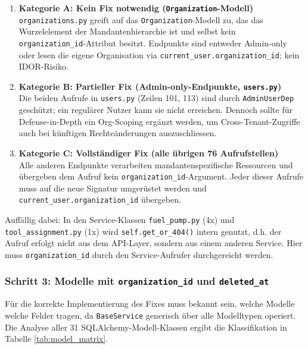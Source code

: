 \begin{enumerate}
    \item \textbf{Kategorie A: Kein Fix notwendig (\texttt{Organization}-Modell)}\\
          \texttt{organizations.py} greift auf das \texttt{Organization}-Modell zu, das
          das Wurzelelement der Mandantenhierarchie ist und selbst kein
          \texttt{organization\_id}-Attribut besitzt. Endpunkte sind entweder
          Admin-only oder lesen die eigene Organisation via
          \texttt{current\_user.organization\_id}; kein IDOR-Risiko.

    \item \textbf{Kategorie B: Partieller Fix (Admin-only-Endpunkte, \texttt{users.py})}\\
          Die beiden Aufrufe in \texttt{users.py} (Zeilen 101, 113) sind durch
          \texttt{AdminUserDep} geschützt; ein regulärer Nutzer kann sie nicht
          erreichen. Dennoch sollte für Defense-in-Depth ein Org-Scoping ergänzt werden,
          um Cross-Tenant-Zugriffe auch bei künftigen Rechteänderungen auszuschliessen.

    \item \textbf{Kategorie C: Vollständiger Fix (alle übrigen 76 Aufrufstellen)}\\
          Alle anderen Endpunkte verarbeiten mandantenspezifische Ressourcen und
          übergeben dem Aufruf kein \texttt{organization\_id}-Argument. Jeder dieser
          Aufrufe muss auf die neue Signatur umgerüstet werden und
          \texttt{current\_user.organization\_id} übergeben.
\end{enumerate}

Auffällig dabei: In den Service-Klassen \texttt{fuel\_pump.py} (4x) und
\texttt{tool\_assignment.py} (1x) wird \texttt{self.get\_or\_404()} intern genutzt,
d.h. der Aufruf erfolgt nicht aus dem API-Layer, sondern aus einem anderen Service.
Hier muss \texttt{organization\_id} durch den Service-Aufrufer durchgereicht werden.


\subsubsection{Schritt 3: Modelle mit \texttt{organization\_id} und \texttt{deleted\_at}}

Für die korrekte Implementierung des Fixes muss bekannt sein, welche Modelle welche
Felder tragen, da \texttt{BaseService} generisch über alle Modelltypen operiert.
Die Analyse aller 31 SQLAlchemy-Modell-Klassen ergibt die Klassifikation in
Tabelle \ref{tab:model_matrix}.

